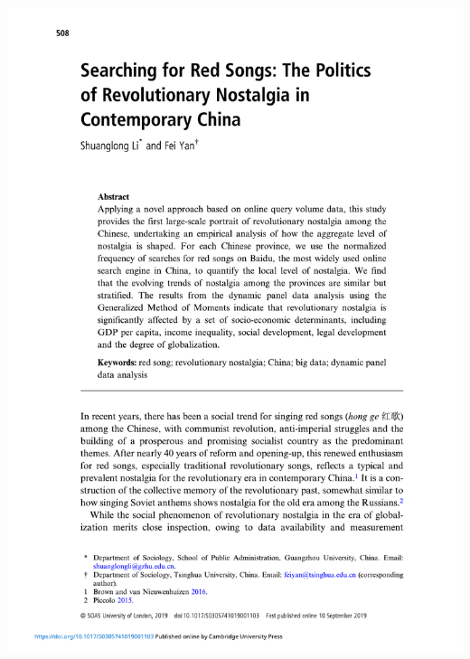 \documentclass[
  10pt,
  ignorenonframetext,
]{beamer}
\begin{document}
\begin{frame}
\begin{center}\includegraphics[width=0.8\linewidth]{Figs/Examples/yan_cover} \end{center}
\end{frame}
\end{document}
